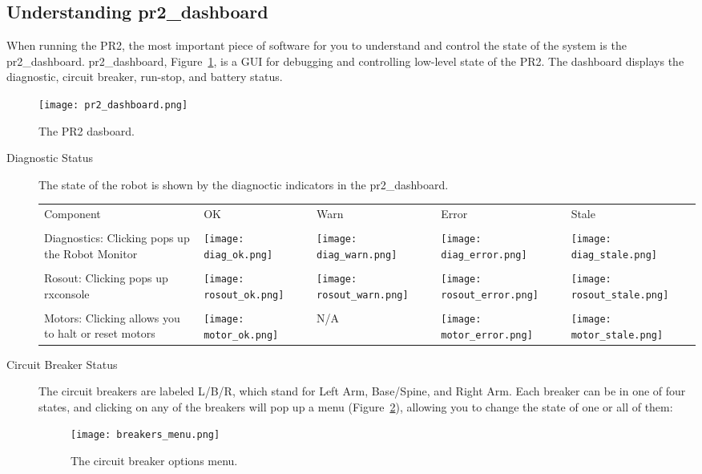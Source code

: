 \subsection{Understanding pr2\_dashboard}
When running the PR2, the most important piece of software for you to understand and control the state of the system is the pr2\_dashboard.
pr2\_dashboard, Figure~\ref{fig:dashboard}, is a GUI for debugging and controlling low-level state of the PR2. The dashboard displays the diagnostic, 
circuit breaker, run-stop, and battery status.
\begin{figure}[h]
\centering
\texttt{[image: pr2\_dashboard.png]}
\caption{The PR2 dasboard.}
\label{fig:dashboard}
\end{figure}
\begin{description}
\item[Diagnostic Status] The state of the robot is shown by the diagnoctic indicators in the pr2\_dashboard. \\

    \begin{tabular}{m{6cm}SSSS}
    Component & OK & Warn & Error & Stale\\
    &&&&\\
    Diagnostics: Clicking pops up the Robot Monitor & \texttt{[image: diag\_ok.png]}&\texttt{[image: diag\_warn.png]}&
                                                      \texttt{[image: diag\_error.png]}&\texttt{[image: diag\_stale.png]}\\
    &&&&\\
    Rosout: Clicking pops up rxconsole & \texttt{[image: rosout\_ok.png]}&\texttt{[image: rosout\_warn.png]}&
                                        \texttt{[image: rosout\_error.png]}&\texttt{[image: rosout\_stale.png]}\\
    &&&&\\
    Motors: Clicking allows you to halt or reset motors & \texttt{[image: motor\_ok.png]}& N/A &
                                                          \texttt{[image: motor\_error.png]}&\texttt{[image: motor\_stale.png]}\\
   \end{tabular}

\item[Circuit Breaker Status] The circuit breakers are labeled L/B/R, which stand for Left Arm, Base/Spine, and Right Arm. 
Each breaker can be in one of four states, and clicking on any of the breakers will pop up a menu (Figure~\ref{fig:breaker_menu}), allowing you to change the state of one or all of them:
\begin{figure}[h]
\centering
\texttt{[image: breakers\_menu.png]}
\caption{The circuit breaker options menu.}
\label{fig:breaker_menu}
\end{figure}


\end{description}
